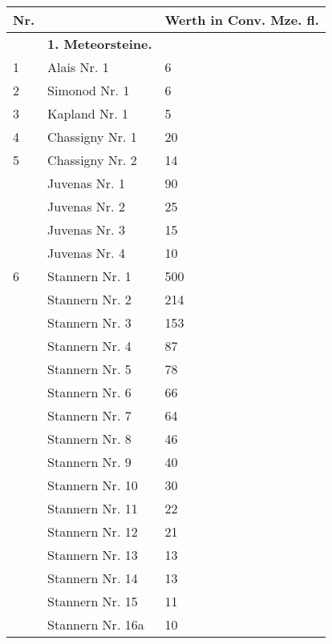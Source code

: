 \documentclass[a4paper, 11pt, oneside, polutonikogreek, german]{article}
\begin{document}
\section{}
\begin{center}
    \begin{longtable}{|l|l|l|}
    \hline
        Nr. &   & Werth in Conv. Mze. fl. \\ \hline
          & \textbf{1. Meteorsteine.} &   \\ \hline
        1 & Alais Nr. 1 & 6 \\ \hline
        2 & Simonod Nr. 1 & 6 \\ \hline
        3 & Kapland Nr. 1 & 5 \\ \hline
        4 & Chassigny Nr. 1 & 20 \\ \hline
        5 & Chassigny Nr. 2 & 14 \\ \hline
          & Juvenas Nr. 1 & 90 \\ \hline
          & Juvenas Nr. 2 & 25 \\ \hline
          & Juvenas Nr. 3 & 15 \\ \hline
          & Juvenas Nr. 4 & 10 \\ \hline
        6 & Stannern Nr. 1 & 500 \\ \hline
          & Stannern Nr. 2 & 214 \\ \hline
          & Stannern Nr. 3 & 153 \\ \hline
          & Stannern Nr. 4 & 87 \\ \hline
          & Stannern Nr. 5 & 78 \\ \hline
          & Stannern Nr. 6 & 66 \\ \hline
          & Stannern Nr. 7 & 64 \\ \hline
          & Stannern Nr. 8 & 46 \\ \hline
          & Stannern Nr. 9 & 40 \\ \hline
          & Stannern Nr. 10 & 30 \\ \hline
          & Stannern Nr. 11 & 22 \\ \hline
          & Stannern Nr. 12 & 21 \\ \hline
          & Stannern Nr. 13 & 13 \\ \hline
          & Stannern Nr. 14 & 13 \\ \hline
          & Stannern Nr. 15 & 11 \\ \hline
          & Stannern Nr. 16a & 10 \\ \hline

\end{longtable}
\end{center}
\end{document}
